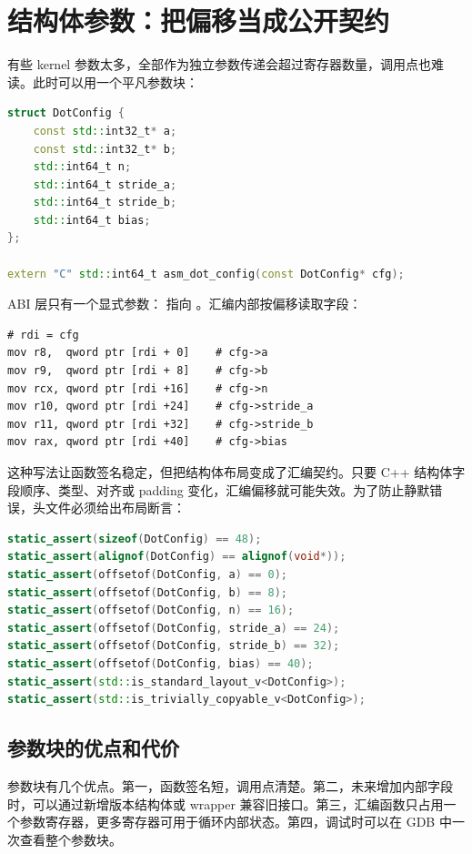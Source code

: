\section{结构体参数：把偏移当成公开契约}

有些 kernel 参数太多，全部作为独立参数传递会超过寄存器数量，调用点也难读。此时可以用一个平凡参数块：

\begin{lstlisting}[language=C++]
struct DotConfig {
    const std::int32_t* a;
    const std::int32_t* b;
    std::int64_t n;
    std::int64_t stride_a;
    std::int64_t stride_b;
    std::int64_t bias;
};

extern "C" std::int64_t asm_dot_config(const DotConfig* cfg);
\end{lstlisting}

ABI 层只有一个显式参数： 指向 。汇编内部按偏移读取字段：

\begin{lstlisting}
# rdi = cfg
mov r8,  qword ptr [rdi + 0]    # cfg->a
mov r9,  qword ptr [rdi + 8]    # cfg->b
mov rcx, qword ptr [rdi +16]    # cfg->n
mov r10, qword ptr [rdi +24]    # cfg->stride_a
mov r11, qword ptr [rdi +32]    # cfg->stride_b
mov rax, qword ptr [rdi +40]    # cfg->bias
\end{lstlisting}

这种写法让函数签名稳定，但把结构体布局变成了汇编契约。只要 C++ 结构体字段顺序、类型、对齐或 padding 变化，汇编偏移就可能失效。为了防止静默错误，头文件必须给出布局断言：

\begin{lstlisting}[language=C++]
static_assert(sizeof(DotConfig) == 48);
static_assert(alignof(DotConfig) == alignof(void*));
static_assert(offsetof(DotConfig, a) == 0);
static_assert(offsetof(DotConfig, b) == 8);
static_assert(offsetof(DotConfig, n) == 16);
static_assert(offsetof(DotConfig, stride_a) == 24);
static_assert(offsetof(DotConfig, stride_b) == 32);
static_assert(offsetof(DotConfig, bias) == 40);
static_assert(std::is_standard_layout_v<DotConfig>);
static_assert(std::is_trivially_copyable_v<DotConfig>);
\end{lstlisting}

\subsection{参数块的优点和代价}

参数块有几个优点。第一，函数签名短，调用点清楚。第二，未来增加内部字段时，可以通过新增版本结构体或 wrapper 兼容旧接口。第三，汇编函数只占用一个参数寄存器，更多寄存器可用于循环内部状态。第四，调试时可以在 GDB 中一次查看整个参数块。

